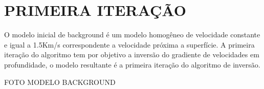 \chapter{PRIMEIRA ITERAÇÃO}
\label{cap4}

O modelo inicial de background é um modelo homogêneo de velocidade constante e igual a 1.5Km/s correspondente
a velocidade próxima a superfície. A primeira iteração do algoritmo tem por objetivo a inversão do gradiente de
velocidades em profundidade, o modelo resultante é a primeira iteração do algoritmo de inversão.

FOTO MODELO BACKGROUND



